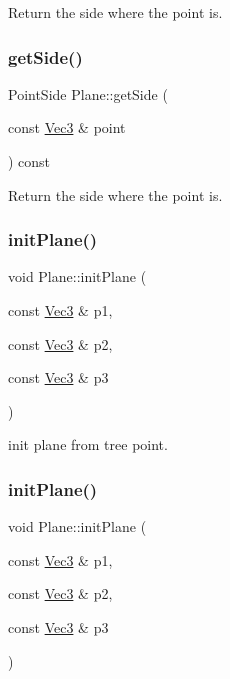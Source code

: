 Return the side where the point is. \mbox{\label{classPlane_ac28f2e1e492b6267819ad3ad38d96c5a}} 
\subsubsection{\texorpdfstring{get\+Side()}{getSide()}\hspace{0.1cm}{\footnotesize\ttfamily [2/2]}}
{\footnotesize\ttfamily Point\+Side Plane\+::get\+Side (\begin{DoxyParamCaption}\item[{const \hyperlink{classVec3}{Vec3} \&}]{point }\end{DoxyParamCaption}) const}

Return the side where the point is. \mbox{\label{classPlane_a8a0523f909ab6a99afd5a28126355856}} 
\subsubsection{\texorpdfstring{init\+Plane()}{initPlane()}\hspace{0.1cm}{\footnotesize\ttfamily [1/6]}}
{\footnotesize\ttfamily void Plane\+::init\+Plane (\begin{DoxyParamCaption}\item[{const \hyperlink{classVec3}{Vec3} \&}]{p1,  }\item[{const \hyperlink{classVec3}{Vec3} \&}]{p2,  }\item[{const \hyperlink{classVec3}{Vec3} \&}]{p3 }\end{DoxyParamCaption})}

init plane from tree point. \mbox{\label{classPlane_a8a0523f909ab6a99afd5a28126355856}} 
\subsubsection{\texorpdfstring{init\+Plane()}{initPlane()}\hspace{0.1cm}{\footnotesize\ttfamily [2/6]}}
{\footnotesize\ttfamily void Plane\+::init\+Plane (\begin{DoxyParamCaption}\item[{const \hyperlink{classVec3}{Vec3} \&}]{p1,  }\item[{const \hyperlink{classVec3}{Vec3} \&}]{p2,  }\item[{const \hyperlink{classVec3}{Vec3} \&}]{p3 }\end{DoxyParamCaption})}

